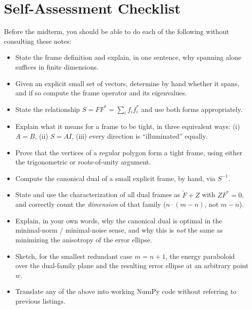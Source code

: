 \section{Self-Assessment Checklist}
\label{sec:checklist}

Before the midterm, you should be able to do each of the following
without consulting these notes:

\begin{itemize}[label=$\square$]
  \item State the frame definition and explain, in one sentence, why
        spanning alone suffices in finite dimensions.
  \item Given an explicit small set of vectors, determine by hand
        whether it spans, and if so compute the frame operator and its
        eigenvalues.
  \item State the relationship $S=FF^*=\sum_if_if_i^*$ and use both
        forms appropriately.
  \item Explain what it means for a frame to be tight, in three
        equivalent ways: (i) $A=B$, (ii) $S=AI$, (iii) every direction
        is ``illuminated'' equally.
  \item Prove that the vertices of a regular polygon form a tight
        frame, using either the trigonometric or roots-of-unity
        argument.
  \item Compute the canonical dual of a small explicit frame, by hand,
        via $S^{-1}$.
  \item State and use the characterization of all dual frames as
        $\tilde F + Z$ with $ZF^*=0$, and correctly count the
        \emph{dimension} of that family ($n\cdot(m-n)$, not $m-n$).
  \item Explain, in your own words, why the canonical dual is optimal
        in the minimal-norm / minimal-noise sense, and why this is
        \emph{not} the same as minimizing the anisotropy of the error
        ellipse.
  \item Sketch, for the smallest redundant case $m=n+1$, the energy
        paraboloid over the dual-family plane and the resulting error
        ellipse at an arbitrary point $w$.
  \item Translate any of the above into working NumPy code without
        referring to previous listings.
\end{itemize}